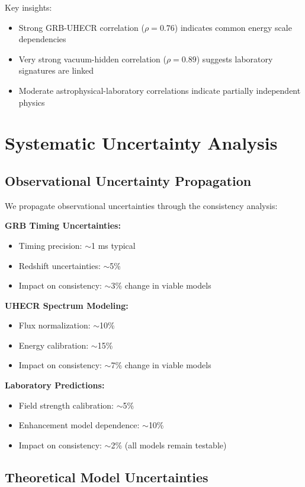 \documentclass[12pt]{article}
\begin{document}
Key insights:
\begin{itemize}
\item Strong GRB-UHECR correlation ($\rho = 0.76$) indicates common energy scale dependencies
\item Very strong vacuum-hidden correlation ($\rho = 0.89$) suggests laboratory signatures are linked
\item Moderate astrophysical-laboratory correlations indicate partially independent physics
\end{itemize}

\section{Systematic Uncertainty Analysis}

\subsection{Observational Uncertainty Propagation}

We propagate observational uncertainties through the consistency analysis:

\textbf{GRB Timing Uncertainties:}
\begin{itemize}
\item Timing precision: $\sim$1 ms typical
\item Redshift uncertainties: $\sim$5\%
\item Impact on consistency: $\sim$3\% change in viable models
\end{itemize}

\textbf{UHECR Spectrum Modeling:}
\begin{itemize}
\item Flux normalization: $\sim$10\%
\item Energy calibration: $\sim$15\%
\item Impact on consistency: $\sim$7\% change in viable models
\end{itemize}

\textbf{Laboratory Predictions:}
\begin{itemize}
\item Field strength calibration: $\sim$5\%
\item Enhancement model dependence: $\sim$10\%
\item Impact on consistency: $\sim$2\% (all models remain testable)
\end{itemize}

\subsection{Theoretical Model Uncertainties}
\end{document}
